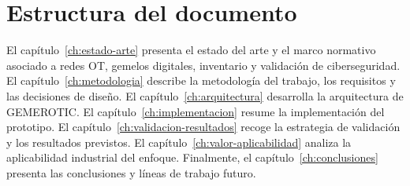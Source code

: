 \section{Estructura del documento} \label{sec:estructura-documento}

El capítulo~\ref{ch:estado-arte} presenta el estado del arte y el marco normativo asociado a redes OT, gemelos digitales, inventario y validación de ciberseguridad. El capítulo~\ref{ch:metodologia} describe la metodología del trabajo, los requisitos y las decisiones de diseño. El capítulo~\ref{ch:arquitectura} desarrolla la arquitectura de GEMEROTIC. El capítulo~\ref{ch:implementacion} resume la implementación del prototipo. El capítulo~\ref{ch:validacion-resultados} recoge la estrategia de validación y los resultados previstos. El capítulo~\ref{ch:valor-aplicabilidad} analiza la aplicabilidad industrial del enfoque. Finalmente, el capítulo~\ref{ch:conclusiones} presenta las conclusiones y líneas de trabajo futuro.
